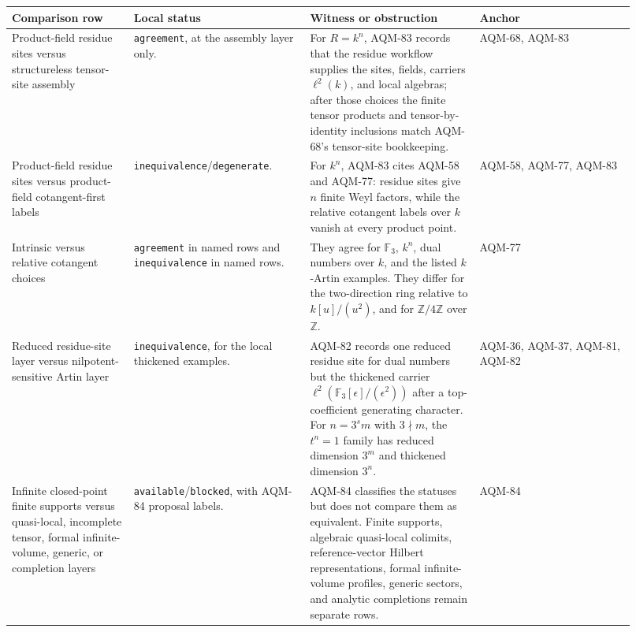 \begin{center}
\scriptsize\setlength{\tabcolsep}{3pt}
\begin{tabular}{p{0.18\linewidth}p{0.26\linewidth}p{0.25\linewidth}p{0.23\linewidth}}
\toprule
Comparison row & Local status & Witness or obstruction & Anchor \\
\midrule
Product-field residue sites versus structureless tensor-site assembly &
\texttt{agreement}, at the assembly layer only. &
For \(R=k^n\), AQM-83 records that the residue workflow supplies the sites,
fields, carriers \(\ell^2(k)\), and local algebras; after those choices the
finite tensor products and tensor-by-identity inclusions match AQM-68's
tensor-site bookkeeping. &
AQM-68, AQM-83 \\
\addlinespace
Product-field residue sites versus product-field cotangent-first labels &
\texttt{inequivalence}/\texttt{degenerate}. &
For \(k^n\), AQM-83 cites AQM-58 and AQM-77: residue sites give \(n\)
finite Weyl factors, while the relative cotangent labels over \(k\) vanish
at every product point. &
AQM-58, AQM-77, AQM-83 \\
\addlinespace
Intrinsic versus relative cotangent choices &
\texttt{agreement} in named rows and \texttt{inequivalence} in named rows. &
They agree for \(\mathbb F_3\), \(k^n\), dual numbers over \(k\), and the
listed \(k\)-Artin examples.  They differ for the two-direction ring relative
to \(k[u]/(u^2)\), and for \(\mathbb Z/4\mathbb Z\) over \(\mathbb Z\). &
AQM-77 \\
\addlinespace
Reduced residue-site layer versus nilpotent-sensitive Artin layer &
\texttt{inequivalence}, for the local thickened examples. &
AQM-82 records one reduced residue site for dual numbers but the thickened
carrier \(\ell^2(\mathbb F_3[\epsilon]/(\epsilon^2))\) after a
top-coefficient generating character.  For \(n=3^s m\) with \(3\nmid m\),
the \(t^n=1\) family has reduced dimension \(3^m\) and thickened dimension
\(3^n\). &
AQM-36, AQM-37, AQM-81, AQM-82 \\
\addlinespace
Infinite closed-point finite supports versus quasi-local, incomplete tensor,
formal infinite-volume, generic, or completion layers &
\texttt{available}/\texttt{blocked}, with AQM-84 proposal labels. &
AQM-84 classifies the statuses but does not compare them as equivalent.
Finite supports, algebraic quasi-local colimits, reference-vector Hilbert
representations, formal infinite-volume profiles, generic sectors, and
analytic completions remain separate rows. &
AQM-84 \\
\bottomrule
\end{tabular}
\end{center}


